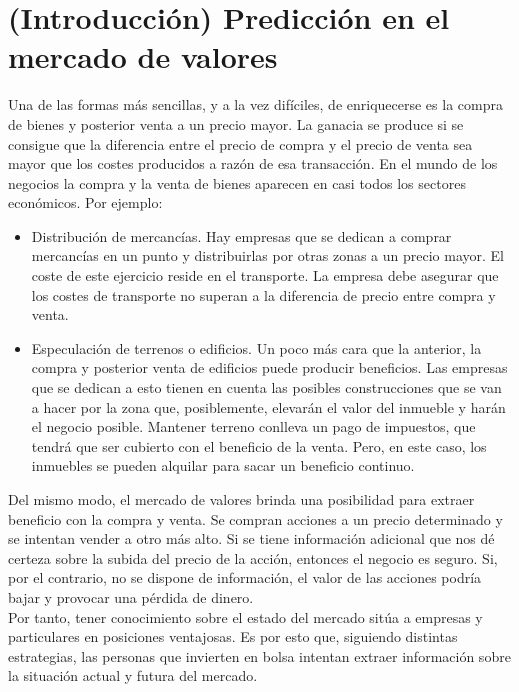 \section{(Introducci\'on) Predicci\'on en el mercado de valores}

Una de las formas más sencillas, y a la vez dif\'iciles, de enriquecerse es la compra de bienes y posterior venta a un precio mayor. La ganacia se produce si se consigue que la diferencia entre el precio de compra y el precio de venta sea mayor que los costes producidos a raz\'on de esa transacci\'on. En el mundo de los negocios la compra y la venta de bienes aparecen en casi todos los sectores econ\'omicos. Por ejemplo:\\

\begin{itemize}
    \item Distribuci\'on de mercanc\'ias. Hay empresas que se dedican a comprar mercanc\'ias en un punto y distribuirlas por otras zonas a un precio mayor. El coste de este ejercicio reside en el transporte. La empresa debe asegurar que los costes de transporte no superan a la diferencia de precio entre compra y venta.
    
    \item Especulaci\'on de terrenos o edificios. Un poco m\'as cara que la anterior, la compra y posterior venta de edificios puede producir beneficios. Las empresas que se dedican a esto tienen en cuenta las posibles construcciones que se van a hacer por la zona que, posiblemente, elevar\'an el valor del inmueble y har\'an el negocio posible. Mantener terreno conlleva un pago de impuestos, que tendr\'a que ser cubierto con el beneficio de la venta. Pero, en este caso, los inmuebles se pueden alquilar para sacar un beneficio continuo.
\end{itemize}

Del mismo modo, el mercado de valores brinda una posibilidad para extraer beneficio con la compra y venta. Se compran acciones a un precio determinado y se intentan vender a otro m\'as alto. Si se tiene informaci\'on adicional que nos d\'e certeza sobre la subida del precio de la acci\'on, entonces el negocio es seguro. Si, por el contrario, no se dispone de informaci\'on, el valor de las acciones podr\'ia bajar y provocar una p\'erdida de dinero.\\

Por tanto, tener conocimiento sobre el estado del mercado sit\'ua a empresas y particulares en posiciones ventajosas. Es por esto que, siguiendo distintas estrategias, las personas que invierten en bolsa intentan extraer informaci\'on sobre la situaci\'on actual y futura del mercado.\\

